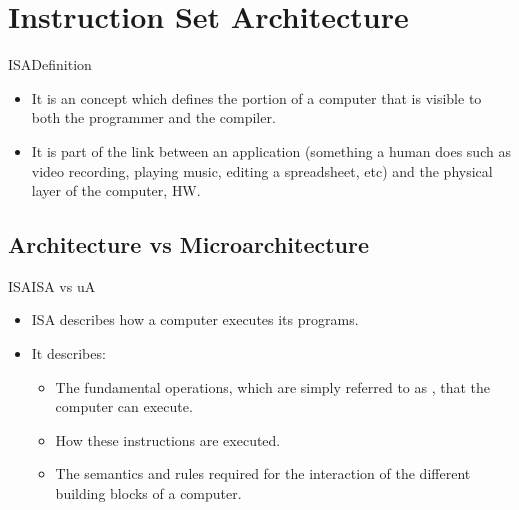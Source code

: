 %
%
%

\section{Instruction Set Architecture}
\begin{frame}{\acl{ISA}}{Definition}
\begin{itemize}
  \item It is an  concept which defines the portion of a computer that is visible to both the programmer and the compiler.
  \item It is part of the link between an application (something a human does such as video recording, playing music, editing a spreadsheet, etc) and the physical layer of the computer, \ie \ac{HW}.
\end{itemize}
\end{frame}

\subsection{Architecture vs Microarchitecture}
\begin{frame}{\acl{ISA}}{\acs{ISA} vs \acs{uA}}
\begin{itemize}
  \item \ac{ISA}  describes how a computer executes its programs. 
  \item It describes:
  \begin{itemize}
    \item The fundamental operations, which are simply referred to as , that the computer can execute.
    \item How these instructions are executed.
    \item The semantics and rules required for the interaction of the different building blocks of a computer.
  \end{itemize}      
\end{itemize}
\end{frame}


